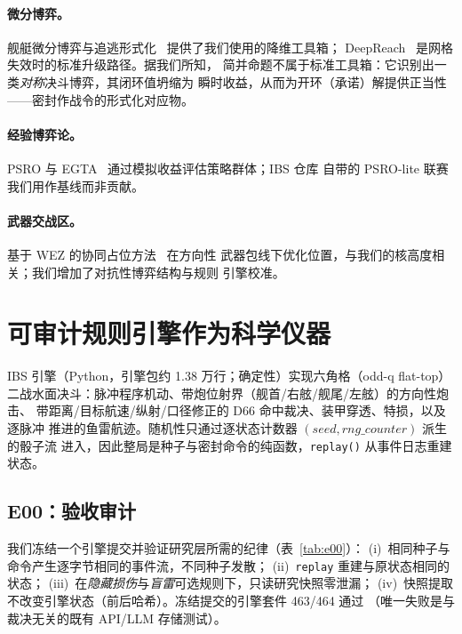 \documentclass[12pt,a4paper]{ctexart}
\begin{document}
\paragraph{微分博弈。} 舰艇微分博弈与追逃形式化~\cite{solis2020,
weintraub2020,cubic1993} 提供了我们使用的降维工具箱；
DeepReach~\cite{bansal2021} 是网格失效时的标准升级路径。据我们所知，
简并命题不属于标准工具箱：它识别出一类\emph{对称}决斗博弈，其闭环值坍缩为
瞬时收益，从而为开环（承诺）解提供正当性——密封作战令的形式化对应物。

\paragraph{经验博弈论。} PSRO 与 EGTA~\cite{lanctot2017,bighashdel2024,
wellman2024,omidshafiei2019,adam2021} 通过模拟收益评估策略群体；IBS 仓库
自带的 PSRO-lite 联赛我们用作基线而非贡献。

\paragraph{武器交战区。} 基于 WEZ 的协同占位方法~\cite{wez2022} 在方向性
武器包线下优化位置，与我们的核高度相关；我们增加了对抗性博弈结构与规则
引擎校准。

\section{可审计规则引擎作为科学仪器}\label{sec:audit}

IBS 引擎（Python，引擎包约 1.38 万行；确定性）实现六角格（odd-q flat-top）
二战水面决斗：脉冲程序机动、带炮位射界（舰首/右舷/舰尾/左舷）的方向性炮击、
带距离/目标航速/纵射/口径修正的 D66 命中裁决、装甲穿透、特损，以及逐脉冲
推进的鱼雷航迹。随机性只通过逐状态计数器 $(seed, rng\_counter)$ 派生的骰子流
进入，因此整局是种子与密封命令的纯函数，\texttt{replay()} 从事件日志重建状态。

\subsection{E00：验收审计}
我们冻结一个引擎提交并验证研究层所需的纪律（表~\ref{tab:e00}）：
(i)~相同种子与命令产生逐字节相同的事件流，不同种子发散；
(ii)~\texttt{replay} 重建与原状态相同的状态；
(iii)~在\emph{隐藏损伤}与\emph{盲雷}可选规则下，只读研究快照零泄漏；
(iv)~快照提取不改变引擎状态（前后哈希）。冻结提交的引擎套件 463/464 通过
（唯一失败是与裁决无关的既有 API/LLM 存储测试）。
\end{document}
